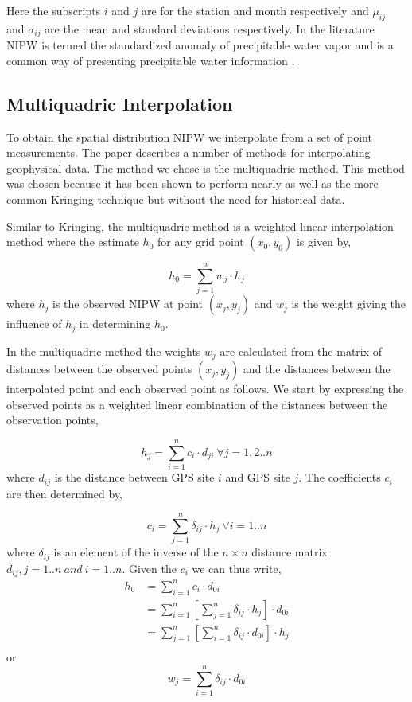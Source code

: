 \documentclass[proposal]{umassthesis}
\begin{document}
Here the subscripts $i$ and $j$ are for the station and month respectively and $\mu_{ij}$ and $\sigma_{ij}$ are the mean and standard deviations respectively. In the literature NIPW is termed the standardized anomaly of precipitable water vapor and is a common way of presenting precipitable water information \cite{grumm2001standardized}.

\subsection{Multiquadric Interpolation}

To obtain the spatial distribution NIPW we interpolate from a set of point measurements. The paper \cite{tabios1985comparative} describes a number of methods for interpolating geophysical data. The method we chose is the multiquadric method. This method was chosen because it has been shown to perform nearly as well as the more common Kringing technique \cite{radhakrishna2015precipitable} but without the need for historical data.

Similar to Kringing, the multiquadric method is a weighted linear interpolation method where the estimate $h_0$ for any grid point $(x_0,y_0)$ is given by,

\begin{equation}
h_0 = \sum_{j=1}^{n} w_j \cdot h_j
\end{equation}
where $h_j$ is the observed NIPW at point $(x_j,y_j)$ and $w_j$ is the weight giving the influence of $h_j$ in determining $h_0$.

In the multiquadric method the weights $w_j$ are calculated from the matrix of distances between the observed points $(x_j,y_j)$ and the distances between the interpolated point and each observed point as follows. We start by expressing the observed points as a weighted linear combination of the distances between the observation points,

\begin{equation}
h_j = \sum_{i=1}^{n} c_i \cdot d_{ji} \ \forall j = 1,2..n
\end{equation}
where $d_{ij}$ is the distance between GPS site $i$ and GPS site $j$. The coefficients $c_i$ are then determined by,

\begin{equation}
c_i = \sum_{j=1}^{n} \delta_{ij} \cdot h_j \ \forall i = 1..n
\end{equation}
where $\delta_{ij}$ is an element of the inverse of the $n \times n$ distance matrix $d_{ij}, j = 1..n \ and \ i = 1..n$. Given the $c_i$ we can thus write,
\begin{align*}
h_0 & = \sum_{i=1}^n c_i \cdot d_{0i} \\
 & =  \sum_{i=1}^n [ \sum_{j=1}^n \delta_{ij} \cdot h_j ] \cdot d_{0i} \\
& =  \sum_{j=1}^n [ \sum_{i=1}^n \delta_{ij} \cdot d_{0i} ] \cdot h_j \\
\end{align*}
or
\begin{equation}
w_j = \sum_{i=1}^n \delta_{ij} \cdot d_{0i}
\end{equation}
\end{document}
